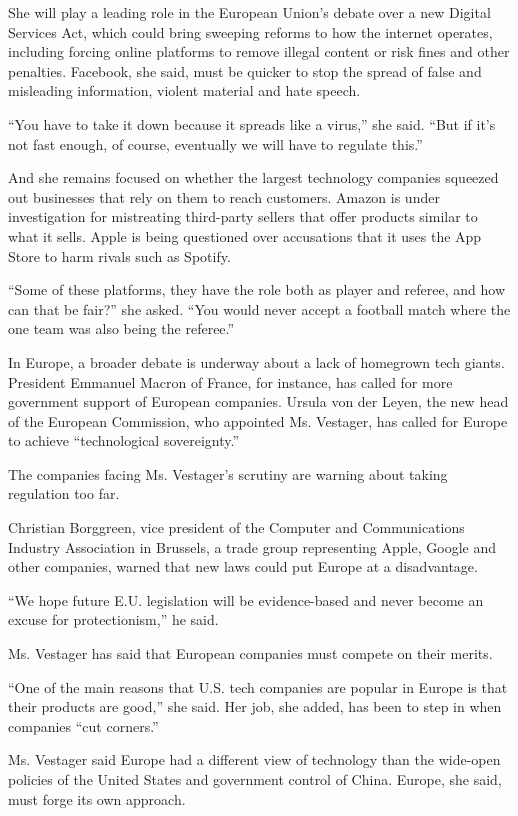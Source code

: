 She will play a leading role in the European Union's debate over a new
Digital Services Act, which could bring sweeping reforms to how the
internet operates, including forcing online platforms to remove illegal
content or risk fines and other penalties. Facebook, she said, must be
quicker to stop the spread of false and misleading information, violent
material and hate speech.

``You have to take it down because it spreads like a virus,'' she said.
``But if it's not fast enough, of course, eventually we will have to
regulate this.''

And she remains focused on whether the largest technology companies
squeezed out businesses that rely on them to reach customers. Amazon is
under investigation for mistreating third-party sellers that offer
products similar to what it sells. Apple is being questioned over
accusations that it uses the App Store to harm rivals such as Spotify.

``Some of these platforms, they have the role both as player and
referee, and how can that be fair?'' she asked. ``You would never accept
a football match where the one team was also being the referee.''

In Europe, a broader debate is underway about a lack of homegrown tech
giants. President Emmanuel Macron of France, for instance, has called
for more government support of European companies. Ursula von der Leyen,
the new head of the European Commission, who appointed Ms. Vestager, has
called for Europe to achieve ``technological sovereignty.''

The companies facing Ms. Vestager's scrutiny are warning about taking
regulation too far.

Christian Borggreen, vice president of the Computer and Communications
Industry Association in Brussels, a trade group representing Apple,
Google and other companies, warned that new laws could put Europe at a
disadvantage.

``We hope future E.U. legislation will be evidence-based and never
become an excuse for protectionism,'' he said.

Ms. Vestager has said that European companies must compete on their
merits.

``One of the main reasons that U.S. tech companies are popular in Europe
is that their products are good,'' she said. Her job, she added, has
been to step in when companies ``cut corners.''

Ms. Vestager said Europe had a different view of technology than the
wide-open policies of the United States and government control of China.
Europe, she said, must forge its own approach.

